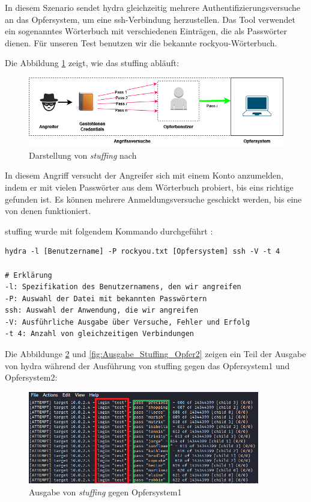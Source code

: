 In diesem Szenario sendet \gls{hydra} gleichzeitig mehrere Authentifizierungsversuche an das Opfersystem, um eine \gls{ssh}-Verbindung herzustellen. Das Tool verwendet ein sogenanntes Wörterbuch mit verschiedenen Einträgen, die als Passwörter dienen. Für unseren Test benutzen wir die bekannte \gls{rockyou}-Wörterbuch.

Die Abbildung \ref{fig:stuffing} zeigt, wie das \gls{stuffing} abläuft:
\begin{figure}[H]
   \centering
   \includegraphics[width=1\textwidth]{assets/Stuffing.png}
   \caption[Darstellung von \textit{\gls{stuffing}}]
   {Darstellung von \textit{\gls{stuffing}} nach \cite{Nguyen_stuffing}}
   \label{fig:stuffing}
   \centering
\end{figure}

In diesem Angriff versucht der Angreifer sich mit einem Konto anzumelden, indem er mit vielen Passwörter aus dem Wörterbuch probiert, bis eins richtige gefunden ist. Es können mehrere Anmeldungsversuche geschickt werden, bis eine von denen funktioniert.

\newpage
\gls{stuffing} wurde mit folgendem Kommando durchgeführt \citep{kali_hydra}:
{
\begin{Verbatim}[frame=single]
hydra -l [Benutzername] -P rockyou.txt [Opfersystem] ssh -V -t 4

# Erklärung
-l: Spezifikation des Benutzernamens, den wir angreifen
-P: Auswahl der Datei mit bekannten Passwörtern
ssh: Auswahl der Anwendung, die wir angreifen
-V: Ausführliche Ausgabe über Versuche, Fehler und Erfolg
-t 4: Anzahl von gleichzeitigen Verbindungen
\end{Verbatim}
}

Die Abbildunge \ref{fig:Ausgabe_Stuffing_Opfer1} und \ref{fig:Ausgabe_Stuffing_Opfer2} zeigen ein Teil der Ausgabe von \gls{hydra} während der Ausführung von \gls{stuffing} gegen das Opfersystem1 und Opfersystem2:
\begin{figure}[H]
   \centering
   \includegraphics[width=0.9\textwidth]{assets/stuffing_kali.png}
   \caption[Ausgabe von \textit{\gls{stuffing}} gegen Opfersystem1]
   {Ausgabe von \textit{\gls{stuffing}} gegen Opfersystem1}
   \label{fig:Ausgabe_Stuffing_Opfer1}
   \centering
\end{figure}

